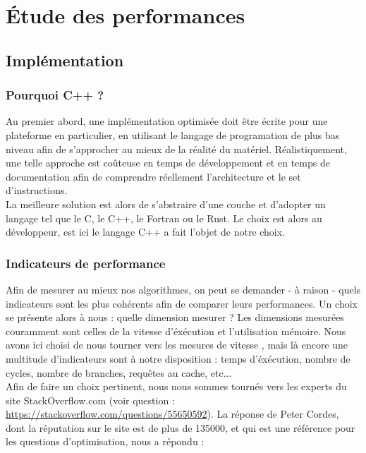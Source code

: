 \newpage
\section{Étude des performances}

\subsection{Implémentation}
\subsubsection{Pourquoi C++ ?}
Au premier abord, une implémentation optimisée doit être écrite pour une plateforme en particulier, en utilisant le langage de programation de plus bas niveau afin de s'approcher au mieux de la réalité du matériel. Réalistiquement, une telle approche est coûteuse en temps de développement et en temps de documentation afin de comprendre réellement l'architecture et le set d'instructions. \\

La meilleure solution est alors de s'abstraire d'une couche et d'adopter un langage tel que le C, le C++, le Fortran ou le Rust. Le choix est alors au développeur, est ici le langage C++ a fait l'objet de notre choix.\\



\subsubsection{Indicateurs de performance}
Afin de mesurer au mieux nos algorithmes, on peut se demander - à raison - quels indicateurs sont les plus cohérents afin de comparer leurs performances. Un choix se présente alors à nous : quelle dimension mesurer ? Les dimensions mesurées couramment sont celles de la vitesse d'éxécution et l'utilisation mémoire. Nous avons ici choisi de nous tourner vers les mesures de vitesse , mais là encore une multitude d'indicateurs sont à notre disposition : temps d'éxécution, nombre de cycles, nombre de branches, requêtes au cache, etc...\\

Afin de faire un choix pertinent, nous nous sommes tournés vers les experts du site StackOverflow.com (voir question : \url{https://stackoverflow.com/questions/55650592}). La réponse de Peter Cordes, dont la réputation sur le site est de plus de 135000, et qui est une référence pour les questions d'optimisation, nous a répondu :\\

